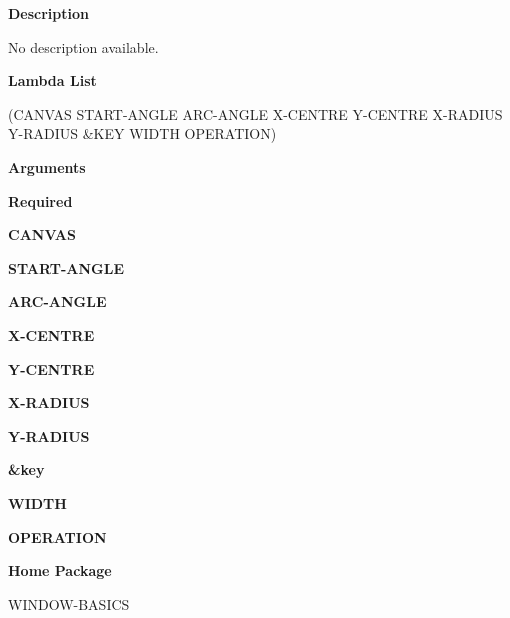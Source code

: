  
{\bf Description}

No description available.

 
{\bf Lambda List}

(CANVAS START-ANGLE ARC-ANGLE X-CENTRE Y-CENTRE X-RADIUS Y-RADIUS \&KEY WIDTH OPERATION)

 
{\bf Arguments}


\beginhang
{\bf Required}\hspace{2em}
 
{\bf CANVAS}


 
{\bf START-ANGLE}


 
{\bf ARC-ANGLE}


 
{\bf X-CENTRE}


 
{\bf Y-CENTRE}


 
{\bf X-RADIUS}


 
{\bf Y-RADIUS}


 
\endhang
\beginhang
{\bf \&key}\hspace{2em}
 
{\bf WIDTH}


 
{\bf OPERATION}


 
\endhang
 
{\bf Home Package}

WINDOW-BASICS

